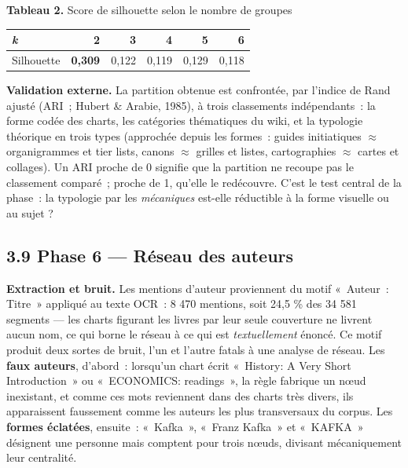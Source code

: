 \documentclass[11pt,a4paper]{article}
\begin{document}
\noindent \textbf{Tableau 2.} Score de silhouette selon le nombre de groupes\\[-0.2em]

\begin{center}\small
\begin{tabular}{lrrrrr}
\toprule
\textbf{\emph{k}} & \textbf{2} & \textbf{3} & \textbf{4} & \textbf{5} & \textbf{6} \\
\midrule
Silhouette & \textbf{0,309} & 0,122 & 0,119 & 0,129 & 0,118 \\
\bottomrule
\end{tabular}
\end{center}

\textbf{Validation externe.} La partition obtenue est confrontée, par l'indice de Rand ajusté (ARI~; Hubert \& Arabie, 1985), à trois classements indépendants~: la forme codée des charts, les catégories thématiques du wiki, et la typologie théorique en trois types (approchée depuis les formes~: guides initiatiques $\approx$ organigrammes et tier lists, canons $\approx$ grilles et listes, cartographies $\approx$ cartes et collages). Un ARI proche de 0 signifie que la partition ne recoupe pas le classement comparé~; proche de 1, qu'elle le redécouvre. C'est le test central de la phase~: la typologie par les \emph{mécaniques} est-elle réductible à la forme visuelle ou au sujet ?

\subsection*{3.9 Phase 6 --- Réseau des auteurs}

\textbf{Extraction et bruit.} Les mentions d'auteur proviennent du motif «~Auteur~: Titre~» appliqué au texte OCR~: 8 470 mentions, soit 24,5 \% des 34 581 segments --- les charts figurant les livres par leur seule couverture ne livrent aucun nom, ce qui borne le réseau à ce qui est \emph{textuellement} énoncé. Ce motif produit deux sortes de bruit, l'un et l'autre fatals à une analyse de réseau. Les \textbf{faux auteurs}, d'abord~: lorsqu'un chart écrit «~History: A Very Short Introduction~» ou «~ECONOMICS: readings~», la règle fabrique un nœud inexistant, et comme ces mots reviennent dans des charts très divers, ils apparaissent faussement comme les auteurs les plus transversaux du corpus. Les \textbf{formes éclatées}, ensuite~: «~Kafka~», «~Franz Kafka~» et «~KAFKA~» désignent une personne mais comptent pour trois nœuds, divisant mécaniquement leur centralité.
\end{document}
